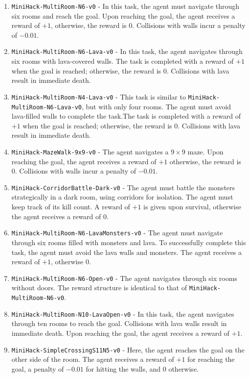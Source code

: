 \documentclass[]{fairmeta}
\begin{document}
\begin{enumerate}
    \item \texttt{MiniHack-MultiRoom-N6-v0} -  In this task, the agent must navigate through six rooms and reach the goal. Upon reaching the goal, the agent receives a reward of $+1$, otherwise, the reward is $0$. Collisions with walls incur a penalty of $-0.01$.
    \item \texttt{MiniHack-MultiRoom-N6-Lava-v0} - In this task, the agent navigates through six rooms with lava-covered walls. The task is completed with a reward of $+1$ when the goal is reached; otherwise, the reward is $0$. Collisions with lava result in immediate death.
    \item \texttt{MiniHack-MultiRoom-N4-Lava-v0} - This task is similar to \texttt{MiniHack-MultiRoom-N6-Lava-v0}, but with only four rooms. The agent must avoid lava-filled walls to complete the task.The task is completed with a reward of $+1$ when the goal is reached; otherwise, the reward is $0$. Collisions with lava result in immediate death.
    \item \texttt{MiniHack-MazeWalk-9x9-v0} - The agent navigates a $9 \times 9$ maze. Upon reaching the goal, the agent receives a reward of $+1$ otherwise, the reward is $0$. Collisions with walls incur a penalty of $-0.01$.
    \item \texttt{MiniHack-CorridorBattle-Dark-v0} -  The agent must battle the monsters strategically in a dark room, using corridors for isolation. The agent must keep track of its kill count. A reward of $+1$ is given upon survival, otherwise the agent receives a reward of $0$.
    \item \texttt{MiniHack-MultiRoom-N6-LavaMonsters-v0} - The agent must navigate through six rooms filled with monsters and lava. To successfully complete this task, the agent must avoid the lava walls and monsters.  The agent receives a reward of $+1$, otherwise $0$.
    \item \texttt{MiniHack-MultiRoom-N6-Open-v0} - The agent navigates through six rooms without doors. The reward structure is identical to that of \texttt{MiniHack-MultiRoom-N6-v0}.
    \item \texttt{MiniHack-MultiRoom-N10-LavaOpen-v0} - In this task, the agent navigates through ten rooms to reach the goal. Collisions with lava walls result in immediate death. Upon reaching the goal, the agent receives a reward of $+1$.
    \item \texttt{MiniHack-SimpleCrossingS11N5-v0} -  Here, the agent reaches the goal on the other side of the room. The agent receives a reward of $+1$ for reaching the goal, a penalty of $-0.01$ for hitting the walls, and $0$ otherwise.

\end{enumerate}
\end{document}
